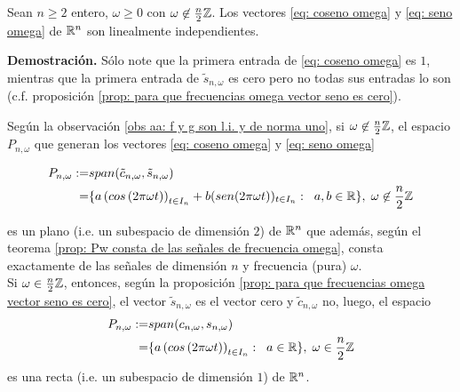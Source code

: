 \begin{obs}
\label{obs aa: f y g son l.i. y de norma uno}
Sean $n \geq 2$ entero, $\omega \geq 0$ con $\omega \not\in \frac{n}{2} \mathbb{Z}$.
Los vectores \eqref{eq: coseno omega} y \eqref{eq: seno omega}
de $\mathbb{R}^{n}$ son linealmente independientes.
\end{obs}
\noindent
\textbf{Demostración.}
Sólo note que 
la primera entrada de \eqref{eq: coseno omega} es $1$, mientras que  
la primera entrada de $\tilde{s}_{n, \omega}$ es cero pero no
todas sus entradas lo son (c.f. proposición 
\ref{prop: para que frecuencias omega vector seno es cero}). 
\QEDB
\vspace{0.2cm}


Según la observación 
\ref{obs aa: f y g son l.i. y de norma uno}, si $\omega \not\in \frac{n}{2} \mathbb{Z}$,
el espacio $P_{n,\omega}$ que generan los vectores 
\eqref{eq: coseno omega} y \eqref{eq: seno omega}

\begin{align}
\label{eq6: 23Ap}
P_{n,\omega}:= & span( \tilde{c}_{n, \omega}, 
\tilde{s}_{n, \omega}) \notag  \\  
= &
\{ a \left( cos \left(2 \pi \omega t \right) \right)_{t \in I_{n}} +
b ( sen (2 \pi \omega t ))_{t \in I_{n}} : 
\hspace{0.2cm} a, b \in \mathbb{R} \},
\hspace{0.1cm} \omega \not\in \frac{n}{2} \mathbb{Z}
\end{align}

\noindent
es un plano (i.e. un subespacio de dimensión $2$) de $\mathbb{R}^{n}$
que además, según el teorema 
\ref{prop: Pw consta de las señales de frecuencia omega},
consta exactamente de las señales
de dimensión $n$ y frecuencia (pura) $\omega$. \\

Si $\omega \in \frac{n}{2} \mathbb{Z}$, entonces, según 
la proposición 
\ref{prop: para que frecuencias omega vector seno es cero}, el vector
$\tilde{s}_{n, \omega}$ es el vector cero y 
$\tilde{c}_{n, \omega}$ no, luego, el espacio
\begin{align}
\label{eq0: 23Ap}
P_{n,\omega}:= & span(c_{n, \omega}, s_{n, \omega}) \notag  \\  
= &
\{ a \left( cos \left(2 \pi \omega t \right) \right)_{t \in I_{n}} : 
\hspace{0.2cm} a \in \mathbb{R} \},
\hspace{0.1cm} \omega \in \frac{n}{2} \mathbb{Z}
\end{align}
es una recta (i.e. un subespacio de dimensión $1$)
de $\mathbb{R}^{n}$.


